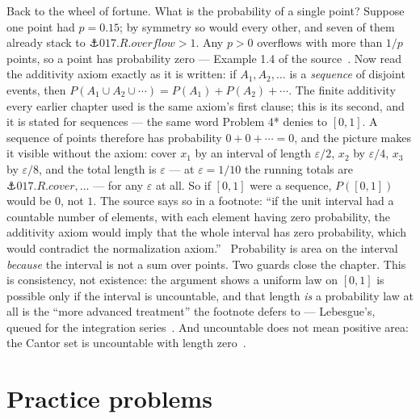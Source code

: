 \begin{narrative}
Back to the wheel of fortune. What is the probability of a single
point? Suppose one point had $p = 0.15$; by symmetry so would every
other, and seven of them already stack to $\anchor{017.R.overflow} >
1$. Any $p > 0$ overflows with more than $1/p$ points, so a point has
probability zero — Example 1.4 of the
source~\cite{probability-bertsekas-and-tsitsiklis-introduction-to-probability-1st-ed}.
Now read the additivity axiom exactly as it is written: if $A_1, A_2,
\ldots$ is a \emph{sequence} of disjoint events, then $P(A_1 \cup A_2
\cup \cdots) = P(A_1) + P(A_2) + \cdots$. The finite additivity every
earlier chapter used is the same axiom's first clause; this is its
second, and it is stated for sequences — the same word Problem 4*
denies to $[0,1]$. A sequence of points therefore has probability $0 +
0 + \cdots = 0$, and the picture makes it visible without the axiom:
cover $x_1$ by an interval of length $\varepsilon/2$, $x_2$ by
$\varepsilon/4$, $x_3$ by $\varepsilon/8$, and the total length is
$\varepsilon$ — at $\varepsilon = 1/10$ the running totals are
$\anchor{017.R.cover}, \ldots$ — for any $\varepsilon$ at all. So if
$[0,1]$ were a sequence, $P([0,1])$ would be $0$, not $1$. The source
says so in a footnote: ``if the unit interval had a countable number of
elements, with each element having zero probability, the additivity
axiom would imply that the whole interval has zero probability, which
would contradict the normalization
axiom.''~\cite{probability-bertsekas-and-tsitsiklis-introduction-to-probability-1st-ed}
Probability is area on the interval \emph{because} the interval is not
a sum over points. Two guards close the chapter. This is consistency,
not existence: the argument shows a uniform law on $[0,1]$ is possible
only if the interval is uncountable, and that length \emph{is} a
probability law at all is the ``more advanced treatment'' the footnote
defers to — Lebesgue's, queued for the integration
series~\cite{probability-john-d-norton-the-material-theory-of-induction-2021-ch-14}.
And uncountable does not mean positive area: the Cantor set is
uncountable with length zero~\cite{probability-wikipedia-null-set}.
\end{narrative}

\section*{Practice problems}

